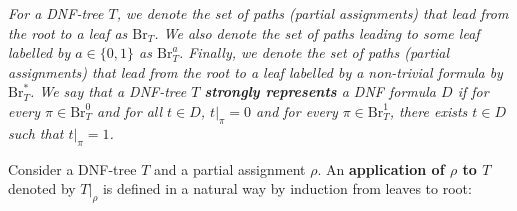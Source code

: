 \emph{For a DNF-tree $T$, we denote the set of paths (partial assignments) that lead from the root to a leaf
as $\mathrm{Br}_{T}$. We also denote the set of paths leading to some
leaf labelled by $a\in\{0,1\}$ as $\mathrm{Br}^{a}_{T}$. Finally, we denote the set of paths (partial assignments) that
lead from the root to a leaf labelled by a non-trivial formula by $\mathrm{Br}^{*}_{T}$. We say that a DNF-tree
$T$ \textbf{strongly represents} a DNF formula $D$ if for every $\pi\in\mathrm{Br}^{0}_{T}$ and for all
$t\in D$, $t|_{\pi}=0$ and for every $\pi\in\mathrm{Br}^{1}_{T}$, there exists $t\in D$ such that
$t|_{\pi}=1$.}\par






Consider a DNF-tree $T$ and a partial assignment $\rho$. An \textbf{application of $\rho$ to $T$}
denoted by $T|_{\rho}$ is defined in a natural way by induction from leaves to root:\par


